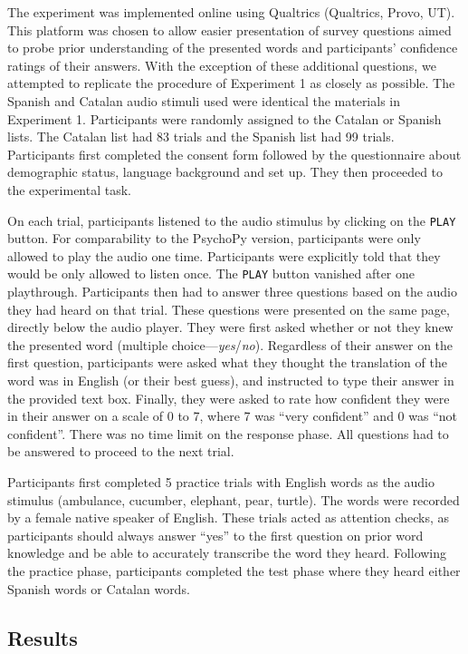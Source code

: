 \documentclass[
]{article}
\begin{document}
The experiment was implemented online using Qualtrics (Qualtrics, Provo,
UT). This platform was chosen to allow easier presentation of survey
questions aimed to probe prior understanding of the presented words and
participants' confidence ratings of their answers. With the exception of
these additional questions, we attempted to replicate the procedure of
Experiment 1 as closely as possible. The Spanish and Catalan audio
stimuli used were identical the materials in Experiment 1. Participants
were randomly assigned to the Catalan or Spanish lists. The Catalan list
had 83 trials and the Spanish list had 99 trials. Participants first
completed the consent form followed by the questionnaire about
demographic status, language background and set up. They then proceeded
to the experimental task.

On each trial, participants listened to the audio stimulus by clicking
on the \texttt{PLAY} button. For comparability to the PsychoPy version,
participants were only allowed to play the audio one time. Participants
were explicitly told that they would be only allowed to listen once. The
\texttt{PLAY} button vanished after one playthrough. Participants then
had to answer three questions based on the audio they had heard on that
trial. These questions were presented on the same page, directly below
the audio player. They were first asked whether or not they knew the
presented word (multiple choice---\emph{yes}/\emph{no}). Regardless of
their answer on the first question, participants were asked what they
thought the translation of the word was in English (or their best
guess), and instructed to type their answer in the provided text box.
Finally, they were asked to rate how confident they were in their answer
on a scale of 0 to 7, where 7 was ``very confident'' and 0 was ``not
confident''. There was no time limit on the response phase. All
questions had to be answered to proceed to the next trial.

Participants first completed 5 practice trials with English words as the
audio stimulus (ambulance, cucumber, elephant, pear, turtle). The words
were recorded by a female native speaker of English. These trials acted
as attention checks, as participants should always answer ``yes'' to the
first question on prior word knowledge and be able to accurately
transcribe the word they heard. Following the practice phase,
participants completed the test phase where they heard either Spanish
words or Catalan words.

\subsection{Results}\label{results-2}
\end{document}
